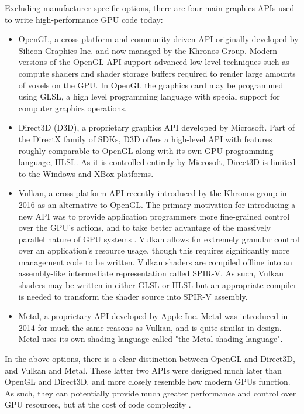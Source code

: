 Excluding manufacturer-specific options, there are four main graphics APIs used to write high-performance GPU code today:

\begin{itemize}
    \item OpenGL, a cross-platform and community-driven API originally developed by Silicon Graphics Inc. and now managed by the Khronos Group. Modern versions of the OpenGL API support advanced low-level techniques such as compute shaders and shader storage buffers required to render large amounts of voxels on the GPU. In OpenGL the graphics card may be programmed using GLSL, a high level programming language with special support for computer graphics operations.
    
    \item Direct3D (D3D), a proprietary graphics API developed by Microsoft. Part of the DirectX family of SDKs, D3D offers a high-level API with features roughly comparable to OpenGL along with its own GPU programming language, HLSL. As it is controlled entirely by Microsoft, Direct3D is limited to the Windows and XBox platforms.
    
    \item Vulkan, a cross-platform API recently introduced by the Khronos group in 2016 as an alternative to OpenGL. The primary motivation for introducing a new API was to provide application programmers more fine-grained control over the GPU's actions, and to take better advantage of the massively parallel nature of GPU systems . Vulkan allows for extremely granular control over an application's resource usage, though this requires significantly more management code to be written. Vulkan shaders are compiled offline into an assembly-like intermediate representation called SPIR-V. As such, Vulkan shaders may be written in either GLSL or HLSL but an appropriate compiler is needed to transform the shader source into SPIR-V assembly.
    
    \item Metal, a proprietary API developed by Apple Inc. Metal was introduced in 2014 for much the same reasons as Vulkan, and is quite similar in design. Metal uses its own shading language called "the Metal shading language".
\end{itemize}

In the above options, there is a clear distinction between OpenGL and Direct3D, and Vulkan and Metal. These latter two APIs were designed much later than OpenGL and Direct3D, and more closely resemble how modern GPUs function. As such, they can potentially provide much greater performance and control over GPU resources, but at the cost of code complexity  \autocite{wyman2015vulkan}.

